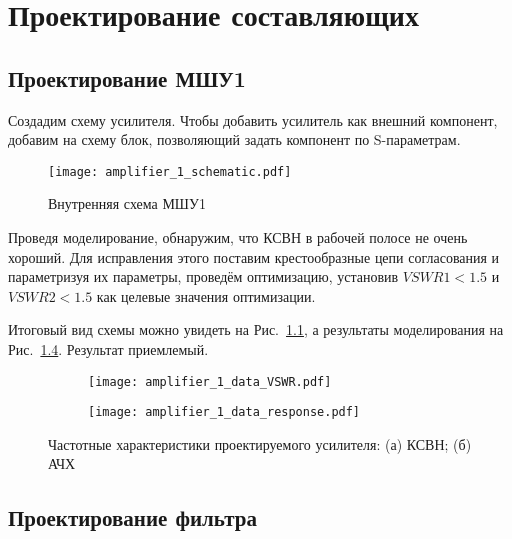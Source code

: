 \chapter{Проектирование составляющих}

\section{Проектирование МШУ1}

Создадим схему усилителя.
Чтобы добавить усилитель как внешний компонент, добавим на схему блок, позволяющий задать компонент по S-параметрам.

\begin{figure}[!ht]
    \centering
    \texttt{[image: amplifier\_1\_schematic.pdf]}
    \caption{Внутренняя схема МШУ1}%
    \label{fig:amplifier_1_schematic}
\end{figure}

Проведя моделирование, обнаружим, что КСВН в рабочей полосе не очень хороший.
Для исправления этого поставим крестообразные цепи согласования и параметризуя их параметры, проведём оптимизацию, установив $VSWR1 < 1.5$ и $VSWR2 < 1.5$ как целевые значения оптимизации.

Итоговый вид схемы можно увидеть на Рис.~\ref{fig:amplifier_1_schematic}, а результаты моделирования на Рис.~\ref{fig:amplifier_1_data}.
Результат приемлемый.

\begin{figure}[!ht]
    \centering
    \begin{subfigure}[b]{0.35\textwidth}
        \centering
        \texttt{[image: amplifier\_1\_data\_VSWR.pdf]}
        \caption{}%
        \label{fig:amplifier_1_data_VSWR}
    \end{subfigure}
    \hfill
    \begin{subfigure}[b]{0.35\textwidth}
        \centering
        \texttt{[image: amplifier\_1\_data\_response.pdf]}
        \caption{}%
        \label{fig:amplifier_1_data_response}
    \end{subfigure}
    \caption{%
        Частотные характеристики проектируемого усилителя:
        (а) КСВН;
        (б) АЧХ
    }%
    \label{fig:amplifier_1_data}
\end{figure}

\section{Проектирование фильтра}

